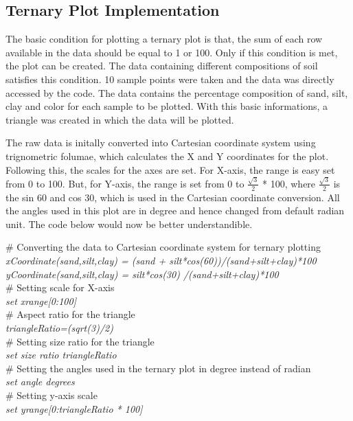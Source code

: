 \documentclass[runningheads]{llncs}
\begin{document}

\subsection{Ternary Plot Implementation}
The basic condition for plotting a ternary plot is that, the sum of each row available in the data should be equal to 1 or 100. Only if this condition is met, the plot can be created. The data containing different compositions of soil satisfies this condition. 10 sample points were taken and the data was directly accessed by the code. The data contains the percentage composition of sand, silt, clay and color for each sample to be plotted. With this basic informations, a triangle was created in which the data will be plotted.

The raw data is initally converted into Cartesian coordinate system using trignometric folumae, which calculates the X and Y coordinates for the plot. Following this, the scales for the axes are set. For X-axis, the range is easy set from 0 to 100. But, for Y-axis, the range is set from 0 to $\frac{\sqrt{3}}{2}$ * 100, where $\frac{\sqrt{3}}{2}$ is the sin 60 and cos 30, which is used in the Cartesian coordinate conversion. All the angles used in this plot are in degree and hence changed from default radian unit. The code below would now be better understandible.

\begin{center}
\# Converting the data to Cartesian coordinate system for ternary plotting \\
\textit{xCoordinate(sand,silt,clay) = (sand + silt*cos(60))/(sand+silt+clay)*100} \\
\textit{yCoordinate(sand,silt,clay) = silt*cos(30) /(sand+silt+clay)*100} \\

\# Setting scale for X-axis \\
\textit{set xrange[0:100]} \\
\# Aspect ratio for the triangle \\
\textit{triangleRatio=(sqrt(3)/2)} \\
\# Setting size ratio for the triangle \\
\textit{set size ratio triangleRatio} \\
\# Setting the angles used in the ternary plot in degree instead of radian \\
\textit{set angle degrees} \\
\# Setting y-axis scale \\
\textit{set yrange[0:triangleRatio * 100]} \\ 
\end{center}
\end{document}
